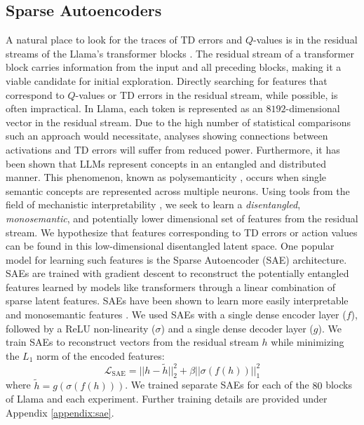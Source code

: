 \documentclass{article}
\begin{document}
\subsection{Sparse Autoencoders}
A natural place to look for the traces of TD errors and $Q$-values is in the residual streams of the Llama's transformer blocks \citep{templeton2024scaling, bricken_towards_2023, gurnee2023finding}. The residual stream of a transformer block carries information from the input and all preceding blocks, making it a viable candidate for initial exploration.
 Directly searching for features that correspond to $Q$-values or TD errors in the residual stream, while possible, is often impractical. In Llama, each token is represented as an $8192$-dimensional vector in the residual stream. Due to the high number of statistical comparisons such an approach would necessitate, analyses showing connections between activations and TD errors will suffer from reduced power. Furthermore, it has been shown that LLMs represent concepts in an entangled and distributed manner. This phenomenon, known as polysemanticity \citep{elhage2022superposition}, occurs when single semantic concepts are represented across multiple neurons. Using tools from the field of mechanistic interpretability \citep{olah_mechanistic_2023}, we seek to learn a \emph{disentangled}, \emph{monosemantic}, and potentially lower dimensional set of features from the residual stream. We hypothesize that features corresponding to TD errors or action values can be found in this low-dimensional disentangled latent space.
One popular model for learning such features is the Sparse Autoencoder (SAE) architecture. SAEs are trained with gradient descent to reconstruct the potentially entangled features learned by models like transformers through a linear combination of sparse latent features. SAEs have been shown to learn more easily interpretable and monosemantic features \citep{cunningham2023sparse, bricken_towards_2023}. We used SAEs with a single dense encoder layer ($f$), followed by a ReLU non-linearity ($\sigma$) and a single dense decoder layer ($g$). We train SAEs to reconstruct vectors from the residual stream $h$ while minimizing the $L_1$ norm of the encoded features:
\begin{equation}\label{eq:sae}
    \mathcal{L}_{\text{SAE}} = || h - \tilde{h}||_2^2 + \beta ||\sigma(f(h))||_1^2
\end{equation}
where $\tilde{h}= g(\sigma(f(h)))$. We trained separate SAEs for each of the $80$ blocks of Llama and each experiment. Further training details are provided under Appendix \ref{appendix:sae}.
\end{document}
